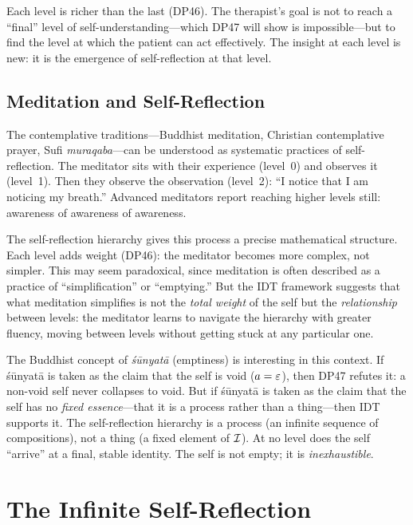 Each level is richer than the last (DP46).  The therapist's goal is not to
reach a ``final'' level of self-understanding---which DP47 will show is
impossible---but to find the level at which the patient can act effectively.
The insight at each level is new: it is the emergence of self-reflection
at that level.

\subsection{Meditation and Self-Reflection}

The contemplative traditions---Buddhist meditation, Christian contemplative
prayer, Sufi \textit{muraqaba}---can be understood as systematic practices
of self-reflection.  The meditator sits with their experience (level~0) and
observes it (level~1).  Then they observe the observation (level~2): ``I
notice that I am noticing my breath.''  Advanced meditators report reaching
higher levels still: awareness of awareness of awareness.

The self-reflection hierarchy gives this process a precise mathematical
structure.  Each level adds weight (DP46): the meditator becomes more complex,
not simpler.  This may seem paradoxical, since meditation is often described
as a practice of ``simplification'' or ``emptying.''  But the IDT framework
suggests that what meditation simplifies is not the \emph{total weight} of
the self but the \emph{relationship} between levels: the meditator learns
to navigate the hierarchy with greater fluency, moving between levels without
getting stuck at any particular one.

The Buddhist concept of \emph{\'{s}\={u}nyat\={a}} (emptiness) is interesting
in this context.  If \'{s}\={u}nyat\={a} is taken as the claim that the self
is void ($a = \varepsilon$), then DP47 refutes it: a non-void self never collapses
to void.  But if \'{s}\={u}nyat\={a} is taken as the claim that the self has no
\emph{fixed essence}---that it is a process rather than a thing---then IDT
supports it.  The self-reflection hierarchy is a process (an infinite sequence
of compositions), not a thing (a fixed element of $\mathcal{I}$).  At no level does
the self ``arrive'' at a final, stable identity.  The self is not empty; it
is \emph{inexhaustible}.

\section{The Infinite Self-Reflection}

